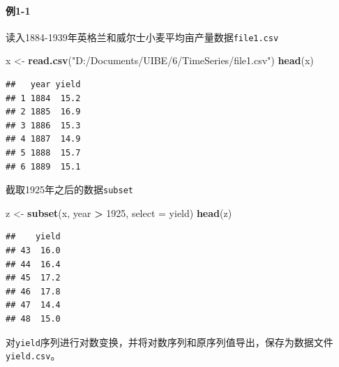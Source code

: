 \documentclass[]{article}
\newenvironment{Shaded}{\begin{snugshade}}{\end{snugshade}}
\newcommand{\CommentTok}[1]{\textcolor[rgb]{0.56,0.35,0.01}{\textit{#1}}}
\newcommand{\DataTypeTok}[1]{\textcolor[rgb]{0.13,0.29,0.53}{#1}}
\newcommand{\DecValTok}[1]{\textcolor[rgb]{0.00,0.00,0.81}{#1}}
\newcommand{\KeywordTok}[1]{\textcolor[rgb]{0.13,0.29,0.53}{\textbf{#1}}}
\newcommand{\NormalTok}[1]{#1}
\newcommand{\OperatorTok}[1]{\textcolor[rgb]{0.81,0.36,0.00}{\textbf{#1}}}
\newcommand{\StringTok}[1]{\textcolor[rgb]{0.31,0.60,0.02}{#1}}
\let\oldparagraph\paragraph
\renewcommand{\paragraph}[1]{\oldparagraph{#1}\mbox{}}
\begin{document}
\hypertarget{ux4f8b1-1}{%
\paragraph{例1-1}\label{ux4f8b1-1}}

读入1884-1939年英格兰和威尔士小麦平均亩产量数据\texttt{file1.csv}

\begin{Shaded}
\begin{Highlighting}[]
\NormalTok{x <-}\StringTok{ }\KeywordTok{read.csv}\NormalTok{(}\StringTok{"D:/Documents/UIBE/6/TimeSeries/file1.csv"}\NormalTok{)}
\KeywordTok{head}\NormalTok{(x)}
\end{Highlighting}
\end{Shaded}

\begin{verbatim}
##   year yield
## 1 1884  15.2
## 2 1885  16.9
## 3 1886  15.3
## 4 1887  14.9
## 5 1888  15.7
## 6 1889  15.1
\end{verbatim}

截取1925年之后的数据\texttt{subset}

\begin{Shaded}
\begin{Highlighting}[]
\NormalTok{z <-}\StringTok{ }\KeywordTok{subset}\NormalTok{(x, year }\OperatorTok{>}\StringTok{ }\DecValTok{1925}\NormalTok{, }\DataTypeTok{select =}\NormalTok{ yield)}
\KeywordTok{head}\NormalTok{(z)}
\end{Highlighting}
\end{Shaded}

\begin{verbatim}
##    yield
## 43  16.0
## 44  16.4
## 45  17.2
## 46  17.8
## 47  14.4
## 48  15.0
\end{verbatim}

对\texttt{yield}序列进行对数变换，并将对数序列和原序列值导出，保存为数据文件\texttt{yield.csv}。

\begin{Shaded}
\end{Shaded}
\end{document}
